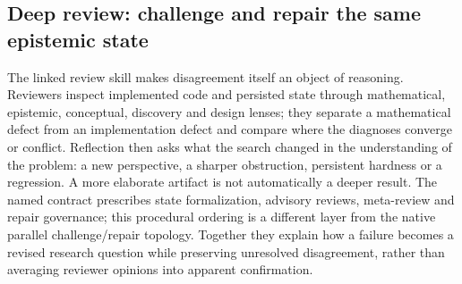 

\subsection{Deep review: challenge and repair the same epistemic state}
\label{app:granular-deep-review-and-reorientation}
The linked review skill makes disagreement itself an object of reasoning.
Reviewers inspect implemented code and persisted state through mathematical,
epistemic, conceptual, discovery and design lenses; they separate a mathematical
defect from an implementation defect and compare where the diagnoses converge or
conflict. Reflection then asks what the search changed in the understanding of
the problem: a new perspective, a sharper obstruction, persistent hardness or a
regression. A more elaborate artifact is not automatically a deeper result.
The named contract prescribes state formalization, advisory reviews, meta-review
and repair governance; this procedural ordering is a different layer from the
native parallel challenge/repair topology. Together they explain how a failure
becomes a revised research question while preserving unresolved disagreement,
rather than averaging reviewer opinions into apparent confirmation.

